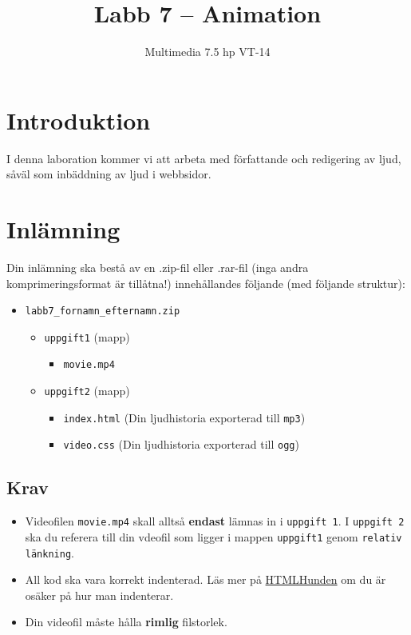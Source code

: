 \documentclass[12pt]{article}
\date{}
\title{ Labb 7 -- Animation }
\author{ Multimedia 7.5 hp VT-14 }
\begin{document}
\maketitle
\vspace{-3.5em}




\section{Introduktion}
I denna laboration kommer vi att arbeta med författande och redigering av ljud, såväl som inbäddning av ljud i webbsidor.

\section{Inlämning}
Din inlämning ska bestå av en .zip-fil eller .rar-fil (inga andra komprimeringsformat är tillåtna!) innehållandes följande (med följande struktur):
  \begin{itemize}
    \item \texttt{labb7\_fornamn\_efternamn.zip}
      \vspace{-0.5em}
      \begin{itemize}
        \item \texttt{uppgift1} (mapp)
          \begin{itemize}
            \item \texttt{movie.mp4}
          \end{itemize}
        \item \texttt{uppgift2} (mapp)
          \begin{itemize}
            \item \texttt{index.html} (Din ljudhistoria exporterad till \texttt{mp3})
            \item \texttt{video.css} (Din ljudhistoria exporterad till \texttt{ogg})
          \end{itemize}
    \end{itemize}
  \end{itemize}

  \subsection{Krav}
  \begin{itemize}
    \item Videofilen \texttt{movie.mp4} skall alltså \textbf{endast} lämnas in i \texttt{uppgift 1}. I \texttt{uppgift 2} ska du referera till din vdeofil som ligger i mappen \texttt{uppgift1} genom \texttt{relativ länkning}.
    \item All kod ska vara korrekt indenterad. Läs mer på \href{http://htmlhunden.se}{HTMLHunden} om du är osäker på hur man indenterar.
    \item Din videofil måste hålla \textbf{rimlig} filstorlek.
  \end{itemize}
\end{document}
